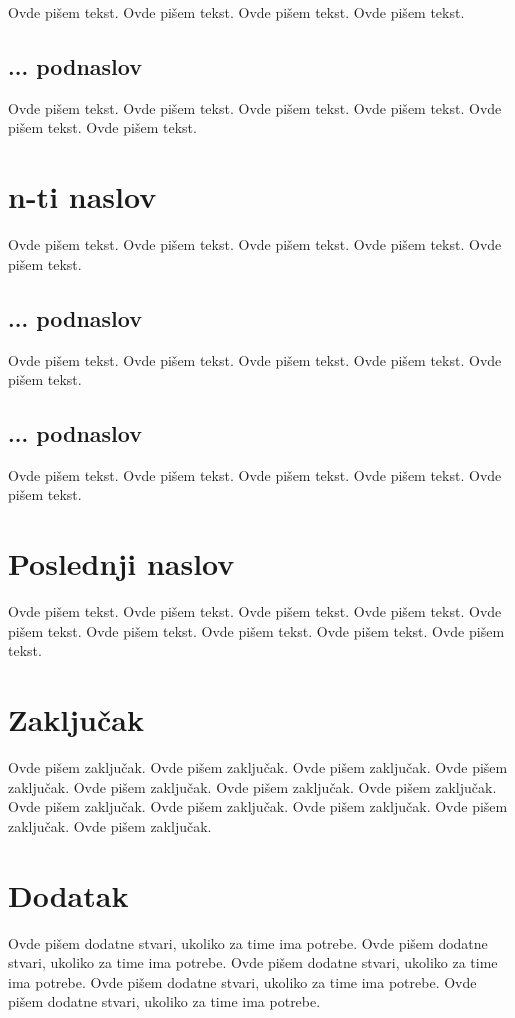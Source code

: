 \documentclass[a4paper]{article}
\begin{document}
Ovde pišem tekst. 
Ovde pišem tekst. 
Ovde pišem tekst. 
Ovde pišem tekst. 

\subsection{... podnaslov}
\label{subsec:podnaslovN}

Ovde pišem tekst. 
Ovde pišem tekst. 
Ovde pišem tekst. 
Ovde pišem tekst. 
Ovde pišem tekst. 
Ovde pišem tekst. 

\section{n-ti naslov}
\label{sec:naslovN}

Ovde pišem tekst. 
Ovde pišem tekst. 
Ovde pišem tekst. 
Ovde pišem tekst. 
Ovde pišem tekst. 

\subsection{... podnaslov}
\label{subsec:podnaslovK}

Ovde pišem tekst. 
Ovde pišem tekst. 
Ovde pišem tekst. 
Ovde pišem tekst. 
Ovde pišem tekst. 

\subsection{... podnaslov}
\label{subsec:podnaslovM}

Ovde pišem tekst. 
Ovde pišem tekst. 
Ovde pišem tekst. 
Ovde pišem tekst. 
Ovde pišem tekst. 

\section{Poslednji naslov}
\label{sec:naslovM}

Ovde pišem tekst. 
Ovde pišem tekst. 
Ovde pišem tekst. 
Ovde pišem tekst. 
Ovde pišem tekst. 
Ovde pišem tekst. 
Ovde pišem tekst. 
Ovde pišem tekst. 
Ovde pišem tekst. 

\section{Zaključak}
\label{sec:zakljucak}

Ovde pišem zaključak. 
Ovde pišem zaključak. 
Ovde pišem zaključak. 
Ovde pišem zaključak. 
Ovde pišem zaključak. 
Ovde pišem zaključak. 
Ovde pišem zaključak. 
Ovde pišem zaključak. 
Ovde pišem zaključak. 
Ovde pišem zaključak. 
Ovde pišem zaključak. 
Ovde pišem zaključak. 


\appendix
 


\appendix
\section{Dodatak}
Ovde pišem dodatne stvari, ukoliko za time ima potrebe.
Ovde pišem dodatne stvari, ukoliko za time ima potrebe.
Ovde pišem dodatne stvari, ukoliko za time ima potrebe.
Ovde pišem dodatne stvari, ukoliko za time ima potrebe.
Ovde pišem dodatne stvari, ukoliko za time ima potrebe.
\end{document}
